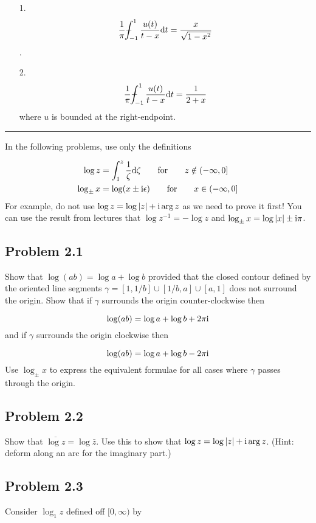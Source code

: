 \documentclass[12pt,a4paper]{article}
\def\qqfor{\qquad\hbox{for}\qquad}
\def\D{ {\rm d} }
\def\I{ {\rm i} }
\def\Xint#1{ \mathchoice
   {\XXint\displaystyle\textstyle{#1} }%
   {\XXint\textstyle\scriptstyle{#1} }%
   {\XXint\scriptstyle\scriptscriptstyle{#1} }%
   {\XXint\scriptscriptstyle\scriptscriptstyle{#1} }%
   \!\int}
\def\XXint#1#2#3{ {\setbox0=\hbox{$#1{#2#3}{\int}$}
     \vcenter{\hbox{$#2#3$}}\kern-.5\wd0} }
\def\dashint{\Xint-}
\def\dt{\D t}
\begin{document}
\begin{itemize}
\item[1. ] \[
{1 \over \pi} \dashint_{-1}^1 {u(t) \over t -x} \dt = {x \over \sqrt{1-x^2}}
\]
.


\item[2. ] \[
{1 \over \pi} \dashint_{-1}^1 {u(t) \over t -x} \dt = {1 \over 2 + x}
\]
where $u$ is bounded at the right-endpoint.

\end{itemize}
\rule{\textwidth}{1pt}
In the following problems, use only the definitions


\begin{align*}
	\log z  &= \int_1^z {1 \over \zeta} \D\zeta \qqfor z \notin (-\infty,0] \\
		\log_\pm x  &= \log(x \pm \I \epsilon)\qqfor x \in (-\infty,0]
\end{align*}
For example, do not use $\log z = \log |z| + \I \arg z$ as we need to prove it first!  You can use the result from lectures  that $\log z^{-1} = - \log z$ and $\log_\pm x =  \log |x| \pm \I \pi$.

\subsection{Problem 2.1}
Show that $\log(ab) = \log a + \log b$ provided that the closed contour defined by the oriented line segments $\gamma = [1, 1/b] \cup [1/b, a] \cup [a, 1]$ does not surround the origin.  Show that if $\gamma$ surrounds the origin counter-clockwise then

\[
	\log(ab) = \log a + \log b + 2 \pi \I
\]
and if $\gamma$ surrounds the origin  clockwise then

\[
	\log(ab) = \log a + \log b - 2 \pi \I
\]
Use $\log_\pm x$ to express the equivalent formulae for all cases where $\gamma$ passes through the origin.

\subsection{Problem 2.2}
Show that $\overline{\log z} = \log \bar z $. Use this to show that $\log z = \log |z| + \I \arg z$. (Hint: deform along an arc for the imaginary part.)

\subsection{Problem 2.3}
Consider $\log_1 z$ defined off $[0,\infty)$ by
\end{document}

